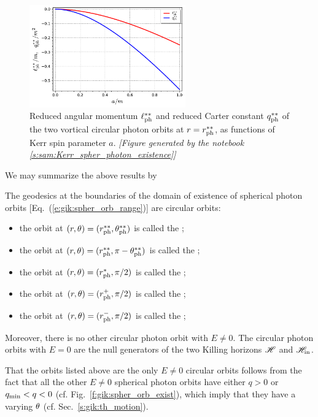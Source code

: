 \begin{figure}
\centerline{\includegraphics[width=0.6\textwidth]{gik_ell_q_rss.pdf}}
\caption[]{\label{f:gik:ell_q_rss} \footnotesize
Reduced angular momentum $\ell_{\rm ph}^{**}$ and reduced Carter constant
$q_{\rm ph}^{**}$ of the two vortical circular photon orbits
at $r = r_{\rm ph}^{**}$, as
functions of Kerr spin parameter $a$.
\textsl{[Figure generated by the notebook \ref{s:sam:Kerr_spher_photon_existence}]}
}
\end{figure}

We may summarize the above results by
\begin{greybox}
The geodesics at the boundaries of the domain of
existence of spherical photon orbits [Eq.~(\ref{e:gik:spher_orb_range})] are circular orbits:
\begin{itemize}
\item the orbit at $(r,\theta)=(r_{\rm ph}^{**},\theta_{\rm ph}^{**})$ is called
the ;
\item the orbit at $(r,\theta)=(r_{\rm ph}^{**},\pi - \theta_{\rm ph}^{**})$ is called
the ;
\item the orbit at $(r,\theta)=(r_{\rm ph}^*,\pi/2)$ is called the ;
\item the orbit at $(r,\theta)=(r_{\rm ph}^+,\pi/2)$ is called the ;
\item the orbit at $(r,\theta)=(r_{\rm ph}^-,\pi/2)$ is called the ;
\end{itemize}
Moreover, there is no other circular photon orbit with $E\neq 0$. The circular photon orbits
with $E=0$ are the null generators of the two Killing horizons $\mathscr{H}$ and $\mathscr{H}_{\rm in}$.
\end{greybox}
That the orbits listed above are the only $E\neq 0$ circular orbits follows from the fact
that all the other $E\neq 0$ spherical photon orbits have either $q > 0$ or $q_{\rm min} < q < 0$
(cf. Fig.~\ref{f:gik:spher_orb_exist}), which imply that they have a varying $\theta$
(cf. Sec.~\ref{s:gik:th_motion}).

